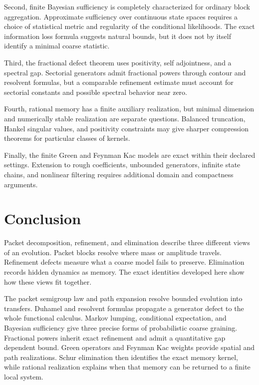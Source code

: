 \documentclass{aomart}
\theoremstyle{definition}
\theoremstyle{remark}
\begin{document}
Second, finite Bayesian sufficiency is completely characterized for ordinary block aggregation. Approximate sufficiency over continuous state spaces requires a choice of statistical metric and regularity of the conditional likelihoods. The exact information loss formula suggests natural bounds, but it does not by itself identify a minimal coarse statistic.

Third, the fractional defect theorem uses positivity, self adjointness, and a spectral gap. Sectorial generators admit fractional powers through contour and resolvent formulas, but a comparable refinement estimate must account for sectorial constants and possible spectral behavior near zero.

Fourth, rational memory has a finite auxiliary realization, but minimal dimension and numerically stable realization are separate questions. Balanced truncation, Hankel singular values, and positivity constraints may give sharper compression theorems for particular classes of kernels.

Finally, the finite Green and Feynman Kac models are exact within their declared settings. Extension to rough coefficients, unbounded generators, infinite state chains, and nonlinear filtering requires additional domain and compactness arguments.

\section{Conclusion}\label{sec:conclusion}

Packet decomposition, refinement, and elimination describe three different views of an evolution. Packet blocks resolve where mass or amplitude travels. Refinement defects measure what a coarse model fails to preserve. Elimination records hidden dynamics as memory. The exact identities developed here show how these views fit together.

The packet semigroup law and path expansion resolve bounded evolution into transfers. Duhamel and resolvent formulas propagate a generator defect to the whole functional calculus. Markov lumping, conditional expectation, and Bayesian sufficiency give three precise forms of probabilistic coarse graining. Fractional powers inherit exact refinement and admit a quantitative gap dependent bound. Green operators and Feynman Kac weights provide spatial and path realizations. Schur elimination then identifies the exact memory kernel, while rational realization explains when that memory can be returned to a finite local system.
\end{document}
